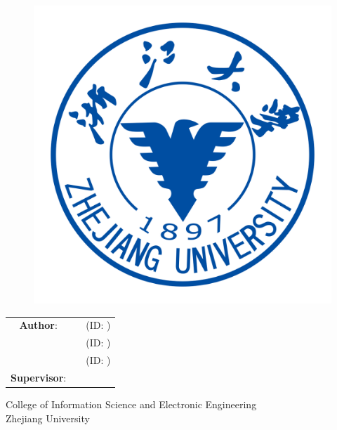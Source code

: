 \makeatletter
\begin{titlepage}
    \begin{center}

        \LARGE
        \textbf{\@title}

        \vspace{1cm}
        
        \thesistype{}
        
        \vspace{1cm}

        \begin{figure}[htbp]
             \centering
             \includegraphics[width=.5\linewidth]{./Figures/ZJU_LOGO.png}
        \end{figure}

        \vspace{1cm}

        
        \begin{table}[htdp]
        	\large
        	\centering
        	\begin{tabular}{ccc}
        		\textbf{Author}:     &  \thesisauthora{} &  (ID: \studentIDa{})\\[10pt]
				        	         &  \thesisauthorb{} &  (ID: \studentIDb{})\\[10pt]
        		                     &  \thesisauthorc{} &  (ID: \studentIDc{})\\[10pt]
        		\textbf{Supervisor}: &  \supervisor{}    &
        	\end{tabular}
        \end{table}
              

        \vspace{1cm}
        \large
        
        College of Information Science and Electronic Engineering\\
        Zhejiang University
       
        \vspace{0.5cm}
        \thesisdate

    \end{center}
\end{titlepage}
\makeatother